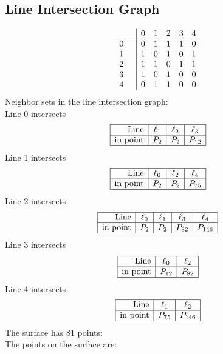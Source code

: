 \documentclass{article}
\begin{document}
{\subsection*{Line Intersection Graph}
{\arraycolsep=1pt
$$
\begin{array}{rr|*{5}r}
 &  & 0 & 1 & 2 & 3 & 4\\
\hline
0 &  & 0 & 1 & 1 & 1 & 0\\
1 &  & 1 & 0 & 1 & 0 & 1\\
2 &  & 1 & 1 & 0 & 1 & 1\\
3 &  & 1 & 0 & 1 & 0 & 0\\
4 &  & 0 & 1 & 1 & 0 & 0\\
\end{array}
$$
}%
Neighbor sets in the line intersection graph:\\
Line 0 intersects 
$$
\begin{array}{|r*{3}{|c}|}
\hline
\mbox{Line}  & \ell_{1} & \ell_{2} & \ell_{3}\\
\hline
\mbox{in point}  & P_{2} & P_{2} & P_{12}\\
\hline
\end{array}
$$
Line 1 intersects 
$$
\begin{array}{|r*{3}{|c}|}
\hline
\mbox{Line}  & \ell_{0} & \ell_{2} & \ell_{4}\\
\hline
\mbox{in point}  & P_{2} & P_{2} & P_{75}\\
\hline
\end{array}
$$
Line 2 intersects 
$$
\begin{array}{|r*{4}{|c}|}
\hline
\mbox{Line}  & \ell_{0} & \ell_{1} & \ell_{3} & \ell_{4}\\
\hline
\mbox{in point}  & P_{2} & P_{2} & P_{82} & P_{146}\\
\hline
\end{array}
$$
Line 3 intersects 
$$
\begin{array}{|r*{2}{|c}|}
\hline
\mbox{Line}  & \ell_{0} & \ell_{2}\\
\hline
\mbox{in point}  & P_{12} & P_{82}\\
\hline
\end{array}
$$
Line 4 intersects 
$$
\begin{array}{|r*{2}{|c}|}
\hline
\mbox{Line}  & \ell_{1} & \ell_{2}\\
\hline
\mbox{in point}  & P_{75} & P_{146}\\
\hline
\end{array}
$$
The surface has 81 points:\\
The points on the surface are:\\
}
\end{document}
